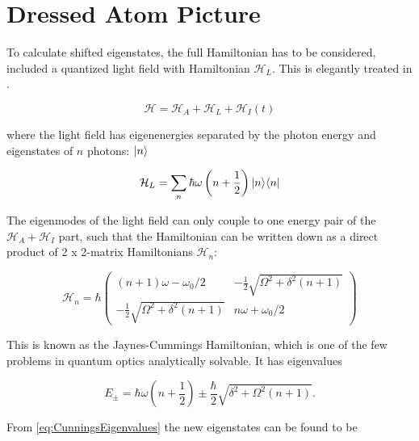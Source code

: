 \chapter{Dressed Atom Picture}\label{ch:DressedApproach}

To calculate shifted eigenstates, the full Hamiltonian has to be considered, included a quantized light field with Hamiltonian $\mathcal{H}_L$. This is elegantly treated in \cite{Dalibard1985}.

\begin{equation}
	\mathcal{H} = \mathcal{H}_A + \mathcal{H}_L + \mathcal{H}_I(t)
\end{equation}

where the light field has eigenenergies separated by the photon energy and eigenstates of $n$ photons: $\lvert n\rangle$ \cite{Vredenbregt2020}

\begin{equation}\label{eq:RadiationModes}
	\mathcal{H}_L = \sum_n \hbar \omega \left(n+\frac{1}{2}\right) \lvert n\rangle\langle n\rvert
\end{equation}

The eigenmodes of the light field can only couple to one energy pair of the $\mathcal{H}_A + \mathcal{H}_I$ part, such that the Hamiltonian can be written down as a direct product of 2 x 2-matrix Hamiltonians \cite{Vredenbregt2020,Hussin2005} $\mathcal{H}_n$:

\begin{equation}\label{eq:CunningsHamiltonian}
    \mathcal{H}_n = \hbar 
    \begin{pmatrix}
        (n + 1)\omega -\omega_0 / 2                     & -\frac{1}{2}\sqrt{\Omega^2+\delta^2(n+1)} \\
        -\frac{1}{2}\sqrt{\Omega^2 + \delta^2(n+1)}  & n\omega + \omega_0/2
    \end{pmatrix}
\end{equation}

This is known as the Jaynes-Cummings Hamiltonian, which is one of the few problems in quantum optics analytically solvable.
It has eigenvalues \cite{Hussin2005}

\begin{equation}\label{eq:CunningsEigenvalues}
    E_{\pm} = \hbar\omega\left(n+\frac{1}{2}\right) \pm \frac{\hbar}{2} \sqrt{\delta^2 + \Omega^2(n+1)}.
\end{equation}

From \cref{eq:CunningsEigenvalues} the new eigenstates can be found to be \cite{Hussin2005}


